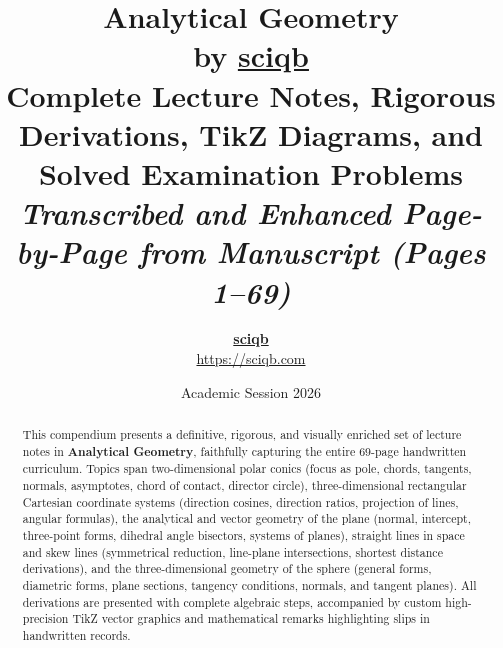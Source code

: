 \documentclass[11pt,a4paper,openany]{report}
\title{\Huge\textbf{\color{primary}Analytical Geometry}\\[0.35cm]
\LARGE\textbf{\color{secondary}by \href{https://sciqb.com}{\color{secondary}\underline{sciqb}}}\\[0.45cm]
\Large\textbf{\color{secondary!85}Complete Lecture Notes, Rigorous Derivations, TikZ Diagrams, and Solved Examination Problems}\\[0.2cm]
\normalsize\textit{Transcribed and Enhanced Page-by-Page from Manuscript (Pages 1--69)}}
\author{\textbf{\Large \href{https://sciqb.com}{sciqb}}\\[0.15cm]\small\href{https://sciqb.com}{\color{secondary}https://sciqb.com}}
\date{\large Academic Session 2026}
\begin{document}
\maketitle

\begin{abstract}
\noindent This compendium presents a definitive, rigorous, and visually enriched set of lecture notes in \textbf{Analytical Geometry}, faithfully capturing the entire 69-page handwritten curriculum. Topics span two-dimensional polar conics (focus as pole, chords, tangents, normals, asymptotes, chord of contact, director circle), three-dimensional rectangular Cartesian coordinate systems (direction cosines, direction ratios, projection of lines, angular formulas), the analytical and vector geometry of the plane (normal, intercept, three-point forms, dihedral angle bisectors, systems of planes), straight lines in space and skew lines (symmetrical reduction, line-plane intersections, shortest distance derivations), and the three-dimensional geometry of the sphere (general forms, diametric forms, plane sections, tangency conditions, normals, and tangent planes). All derivations are presented with complete algebraic steps, accompanied by custom high-precision TikZ vector graphics and mathematical remarks highlighting slips in handwritten records.
\end{abstract}

\vspace{1cm}
\tableofcontents
\newpage








\appendix

\end{document}
